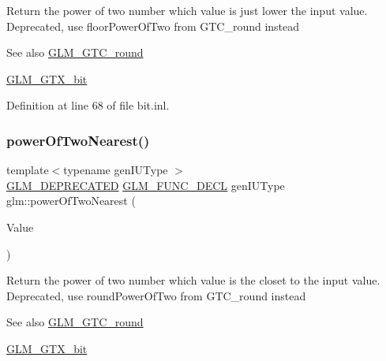 Return the power of two number which value is just lower the input value. Deprecated, use floor\+Power\+Of\+Two from G\+T\+C\+\_\+round instead

\begin{DoxySeeAlso}{See also}
\mbox{\hyperlink{group__gtc__round}{G\+L\+M\+\_\+\+G\+T\+C\+\_\+round}} 

\mbox{\hyperlink{group__gtx__bit}{G\+L\+M\+\_\+\+G\+T\+X\+\_\+bit}} 
\end{DoxySeeAlso}


Definition at line 68 of file bit.\+inl.

\mbox{\label{group__gtx__bit_ga5f65973a5d2ea38c719e6a663149ead9}} 
\subsubsection{\texorpdfstring{powerOfTwoNearest()}{powerOfTwoNearest()}\hspace{0.1cm}{\footnotesize\ttfamily [1/2]}}
{\footnotesize\ttfamily template$<$typename gen\+I\+U\+Type $>$ \\
\mbox{\hyperlink{setup_8hpp_a8edfb48cdc249a3ee48406bf179023dc}{G\+L\+M\+\_\+\+D\+E\+P\+R\+E\+C\+A\+T\+ED}} \mbox{\hyperlink{setup_8hpp_ab2d052de21a70539923e9bcbf6e83a51}{G\+L\+M\+\_\+\+F\+U\+N\+C\+\_\+\+D\+E\+CL}} gen\+I\+U\+Type glm\+::power\+Of\+Two\+Nearest (\begin{DoxyParamCaption}\item[{gen\+I\+U\+Type}]{Value }\end{DoxyParamCaption})}

Return the power of two number which value is the closet to the input value. Deprecated, use round\+Power\+Of\+Two from G\+T\+C\+\_\+round instead

\begin{DoxySeeAlso}{See also}
\mbox{\hyperlink{group__gtc__round}{G\+L\+M\+\_\+\+G\+T\+C\+\_\+round}} 

\mbox{\hyperlink{group__gtx__bit}{G\+L\+M\+\_\+\+G\+T\+X\+\_\+bit}} 
\end{DoxySeeAlso}
\mbox{\label{group__gtx__bit_ga2d7e85995d097518b8d70cd409bda39e}} 
